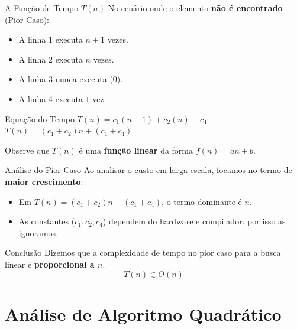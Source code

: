 \documentclass[9pt]{beamer}
\begin{document}
\begin{frame}{A Função de Tempo $T(n)$}
    No cenário onde o elemento \textbf{não é encontrado} (Pior Caso):
    \vspace{0.3cm}
    \begin{itemize}
        \item A linha 1 executa $n+1$ vezes.
        \item A linha 2 executa $n$ vezes.
        \item A linha 3 nunca executa ($0$).
        \item A linha 4 executa $1$ vez.
    \end{itemize}
    \begin{block}{Equação do Tempo}
        $T(n) = c_1(n+1) + c_2(n) + c_4$ \\
        $T(n) = (c_1 + c_2)n + (c_1 + c_4)$
    \end{block}
    \vspace{0.2cm}
    Observe que $T(n)$ é uma \textbf{função linear} da forma $f(n) = an + b$.
\end{frame}

\begin{frame}{Análise do Pior Caso}
    Ao analisar o custo em larga escala, focamos no termo de \textbf{maior crescimento}:
    \vspace{0.4cm}
    \begin{itemize}
        \item Em $T(n) = (c_1 + c_2)n + (c_1 + c_4)$, o termo dominante é $n$.
        \item As constantes ($c_1, c_2, c_4$) dependem do hardware e compilador, por isso as ignoramos.
    \end{itemize}
    \vspace{0.3cm}
    \begin{alertblock}{Conclusão}
        Dizemos que a complexidade de tempo no pior caso para a busca linear é \textbf{proporcional a $n$}.
        \[ T(n) \in O(n) \]
    \end{alertblock}
\end{frame}

\section{Análise de Algoritmo Quadrático}
\end{document}
